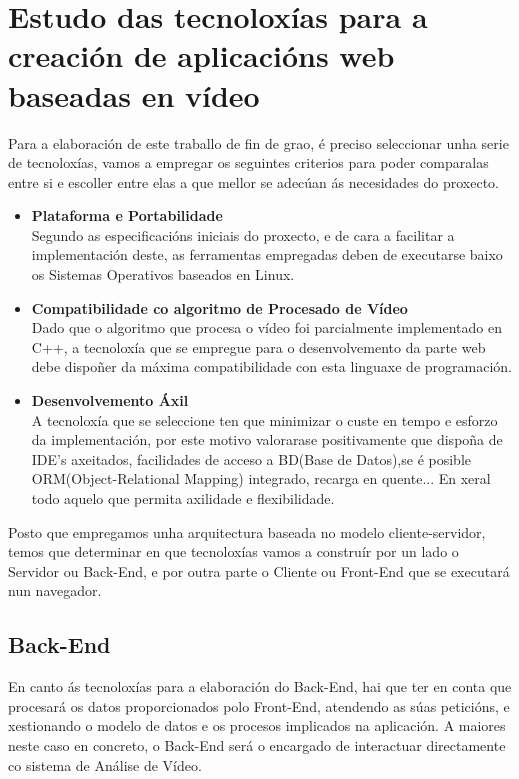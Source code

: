 \chapter{Estudo das tecnoloxías para a creación de aplicacións web baseadas en vídeo}

	Para a elaboración de este traballo de fin de grao, é preciso seleccionar unha serie de
	tecnoloxías, vamos a empregar os seguintes criterios para poder comparalas entre si e 
	escoller entre elas a que mellor se adecúan ás necesidades do proxecto.
	
\begin{itemize}

	\item {\textbf{Plataforma e Portabilidade\\}}
		Segundo as especificacións iniciais do proxecto, e de cara a facilitar a 
		implementación deste, as ferramentas empregadas deben de executarse baixo os
		Sistemas Operativos baseados en Linux.

	\item {\textbf{Compatibilidade co algoritmo de Procesado de Vídeo\\}}
		Dado que o algoritmo que procesa o vídeo foi parcialmente implementado en C++,
		a tecnoloxía que se empregue para o desenvolvemento da parte web debe dispoñer da
		máxima compatibilidade con esta linguaxe de programación.

	\item {\textbf{Desenvolvemento Áxil\\}}
		A tecnoloxía que se seleccione ten que minimizar o custe en tempo e esforzo da 
		implementación, por este motivo valorarase positivamente que dispoña de IDE's axeitados,
		facilidades de acceso a BD(Base de Datos),se é posible ORM(Object-Relational Mapping) 
		integrado, recarga en quente... En xeral todo aquelo que permita axilidade e flexibilidade.

\end{itemize}

Posto que empregamos unha arquitectura baseada no modelo cliente-servidor, temos que determinar 
en que tecnoloxías vamos a construír por un lado o Servidor ou Back-End, e por outra parte o 
Cliente ou Front-End que se executará nun navegador.  

\section{Back-End}
	En canto ás tecnoloxías para a elaboración do Back-End, hai que ter en conta que procesará
	os datos proporcionados polo Front-End, atendendo as súas peticións, e xestionando o modelo de 
	datos e os procesos implicados na aplicación. A maiores neste caso en concreto, o Back-End será
	o encargado de interactuar directamente co sistema de Análise de Vídeo.\\
	
